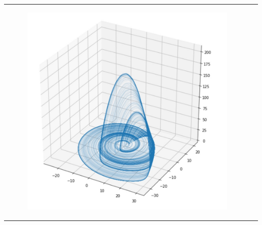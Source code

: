 \begin{frame}
\begin{tabular}{l l}
\begin{minipage}{0.4\textwidth}
\begin{figure}
			\end{figure}\vspace{-4mm}
			\begin{figure}
				\centering
				\hspace{1mm}\includegraphics[width=0.6\linewidth]{figures/roe.jpeg}
			\end{figure}
		\end{minipage}
	\end{tabular}
\end{frame}